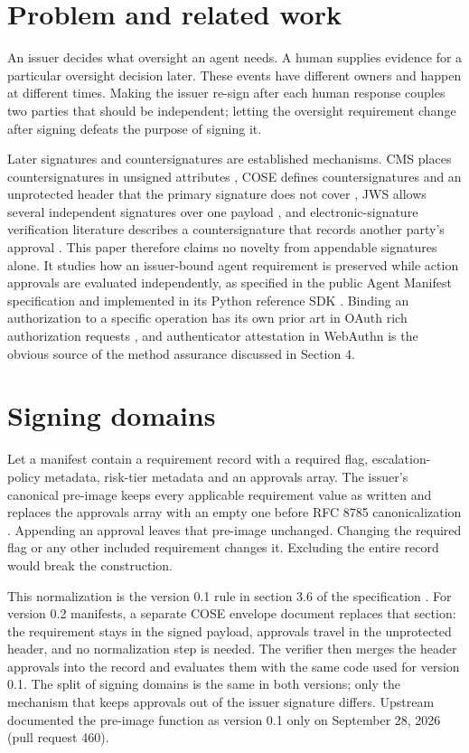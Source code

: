 \documentclass[10pt,letterpaper]{article}
\begin{document}
\section{Problem and related work}

An issuer decides what oversight an agent needs. A human supplies evidence for a particular oversight decision later. These events have different owners and happen at different times. Making the issuer re-sign after each human response couples two parties that should be independent; letting the oversight requirement change after signing defeats the purpose of signing it.


Later signatures and countersignatures are established mechanisms. CMS places countersignatures in unsigned attributes \cite{ref1}, COSE defines countersignatures and an unprotected header that the primary signature does not cover \cite{ref5,ref6}, JWS allows several independent signatures over one payload \cite{ref7}, and electronic-signature verification literature describes a countersignature that records another party's approval \cite{ref2}. This paper therefore claims no novelty from appendable signatures alone. It studies how an issuer-bound agent requirement is preserved while action approvals are evaluated independently, as specified in the public Agent Manifest specification \cite{ref3} and implemented in its Python reference SDK \cite{ref4}. Binding an authorization to a specific operation has its own prior art in OAuth rich authorization requests \cite{ref8}, and authenticator attestation in WebAuthn \cite{ref9} is the obvious source of the method assurance discussed in Section 4.


\section{Signing domains}

Let a manifest contain a requirement record with a required flag, escalation-policy metadata, risk-tier metadata and an approvals array. The issuer's canonical pre-image keeps every applicable requirement value as written and replaces the approvals array with an empty one before RFC 8785 canonicalization \cite{ref10}. Appending an approval leaves that pre-image unchanged. Changing the required flag or any other included requirement changes it. Excluding the entire record would break the construction.


This normalization is the version 0.1 rule in section 3.6 of the specification \cite{ref3}. For version 0.2 manifests, a separate COSE envelope document replaces that section: the requirement stays in the signed payload, approvals travel in the unprotected header, and no normalization step is needed. The verifier then merges the header approvals into the record and evaluates them with the same code used for version 0.1. The split of signing domains is the same in both versions; only the mechanism that keeps approvals out of the issuer signature differs. Upstream documented the pre-image function as version 0.1 only on September 28, 2026 (pull request 460).
\end{document}
